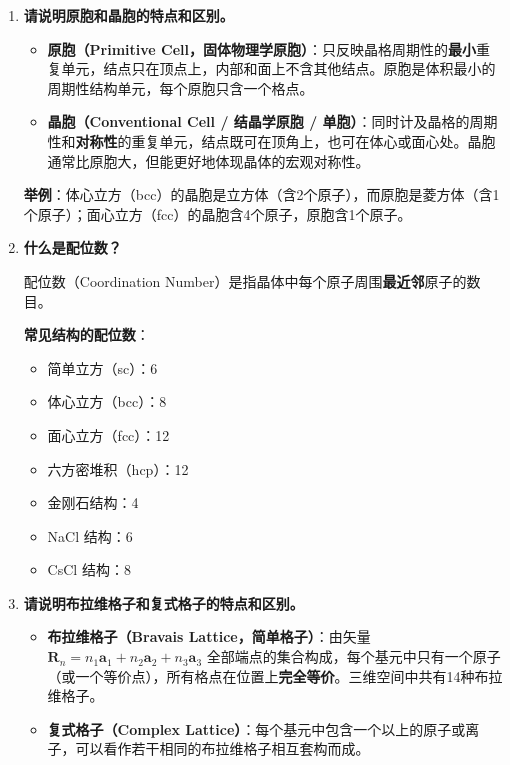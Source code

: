 \begin{enumerate}[label=\textbf{\arabic*.}, leftmargin=2em, itemsep=0.8em]
\item \textbf{请说明原胞和晶胞的特点和区别。}

\begin{itemize}[nosep]
    \item \textbf{原胞（Primitive Cell，固体物理学原胞）}：只反映晶格周期性的\textbf{最小}重复单元，结点只在顶点上，内部和面上不含其他结点。原胞是体积最小的周期性结构单元，每个原胞只含一个格点。
    \item \textbf{晶胞（Conventional Cell / 结晶学原胞 / 单胞）}：同时计及晶格的周期性和\textbf{对称性}的重复单元，结点既可在顶角上，也可在体心或面心处。晶胞通常比原胞大，但能更好地体现晶体的宏观对称性。
\end{itemize}

\textbf{举例}：体心立方（bcc）的晶胞是立方体（含2个原子），而原胞是菱方体（含1个原子）；面心立方（fcc）的晶胞含4个原子，原胞含1个原子。

\item \textbf{什么是配位数？}

配位数（Coordination Number）是指晶体中每个原子周围\textbf{最近邻}原子的数目。

\textbf{常见结构的配位数}：
\begin{itemize}[nosep]
    \item 简单立方（sc）：6
    \item 体心立方（bcc）：8
    \item 面心立方（fcc）：12
    \item 六方密堆积（hcp）：12
    \item 金刚石结构：4
    \item NaCl 结构：6
    \item CsCl 结构：8
\end{itemize}

\item \textbf{请说明布拉维格子和复式格子的特点和区别。}

\begin{itemize}[nosep]
    \item \textbf{布拉维格子（Bravais Lattice，简单格子）}：由矢量 $\mathbf{R}_n = n_1\mathbf{a}_1 + n_2\mathbf{a}_2 + n_3\mathbf{a}_3$ 全部端点的集合构成，每个基元中只有一个原子（或一个等价点），所有格点在位置上\textbf{完全等价}。三维空间中共有14种布拉维格子。
    \item \textbf{复式格子（Complex Lattice）}：每个基元中包含一个以上的原子或离子，可以看作若干相同的布拉维格子相互套构而成。
\end{itemize}


\end{enumerate}
